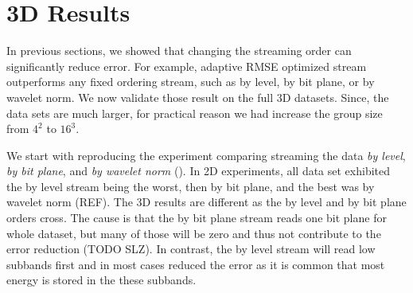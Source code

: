 \section{3D Results}
\label{sec:3d_results}

In previous sections, we showed that changing the streaming order can significantly reduce error. For example,
adaptive RMSE optimized stream outperforms any fixed ordering stream, such as by level,
by bit plane, or by wavelet norm. We now validate those result on the full 3D datasets.
Since, the data sets are much larger, for
practical reason we had increase the group size from $4^2$ to $16^3$.

We start with reproducing the experiment comparing streaming the data \emph{by level}, \emph{by bit plane},
and \emph{by wavelet norm} (). In 2D experiments, all data set exhibited the by level stream
being the worst, then by bit plane, and the best was by wavelet norm (REF). The 3D results are different as
the by level and by bit plane orders cross. The cause is that the by bit plane stream reads one bit plane for whole
dataset, but many of those will be zero and thus not contribute to the error reduction (TODO SLZ). In contrast, the by
level stream will read low subbands first and in most cases reduced the error as it is common that most energy is stored in
the these subbands.

